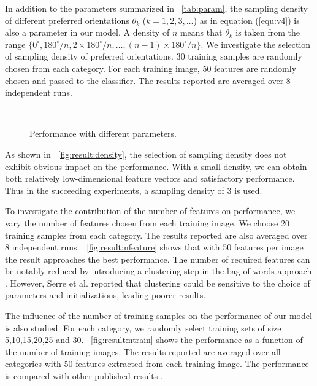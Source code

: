 \documentclass[5p]{elsarticle}
\begin{document}
In addition to the parameters summarized in \tablename~\ref{tab:param},
the sampling density of different preferred orientations $\theta_k$
($k=1,2,3,\dots$) as in equation (\ref{equ:v4}) is also a parameter in our model.
A density of $n$ means that $\theta_k$ is taken from the range
$\{0^{\circ}, 180^{\circ}/n, 2\times 180^{\circ}/n, \dots, (n-1)\times 180^{\circ}/n\}$.
We investigate the selection of sampling density of preferred orientations.
30 training samples are randomly chosen from each category.
For each training image, 50 features are randomly chosen and passed to the classifier.
The results reported are averaged over 8 independent runs.

\begin{figure}[h]
\centering
  \\
\caption{Performance with different parameters.}
\label{fig:result}
\end{figure}

As shown in \figurename~\ref{fig:result:density},
the selection of sampling density does not exhibit obvious impact
on the performance.
With a small density, we can obtain 
both relatively low-dimensional feature vectors
and satisfactory performance.
Thus in the succeeding experiments, a sampling density of $3$ is used. 

To investigate the contribution of the number of features 
on performance,
we vary the number of features chosen from each training image.
We choose 20 training samples from each category.
The results reported are also averaged over 8 independent runs.
\figurename~\ref{fig:result:nfeature} shows that 
with 50 features per image the result approaches the best performance.
The number of required features can be notably reduced by introducing 
a clustering step in the bag of words approach \cite{Csurka2004}.
However, Serre et al. \cite{Serre2007} reported that clustering could
be sensitive to the choice of parameters and initializations,
leading poorer results.

The influence of the number of training samples 
on the performance of our model is also studied.
For each category, we randomly select training sets of size
5,10,15,20,25 and 30.
\figurename~\ref{fig:result:ntrain} shows the performance as
a function of the number of training images.
The results reported are averaged over all categories
with 50 features extracted from each training image.
The performance is compared with other published results
\cite{Bosch2007,Bosch2007b,Zhang2007,Lazebnik2006,Wang2006,Grauman2005}.
\end{document}
